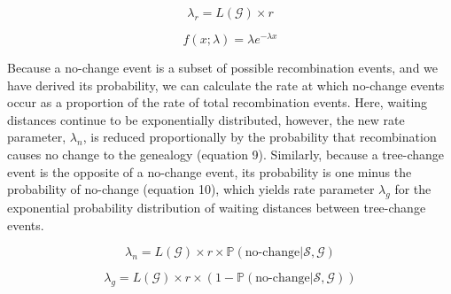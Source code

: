 \documentclass[11pt]{article}
\begin{document}

\begin{equation}
	\lambda_{r} = L(\mathcal{G}) \times r
\end{equation}


\begin{equation}
	f(x; \lambda) = \lambda e^{-\lambda x}
\end{equation}

\noindent Because a no-change event is a subset of possible recombination 
events, and we have derived its probability, we can calculate the rate 
at which no-change events occur as a proportion of the rate of total 
recombination events. 
Here, waiting distances continue to be exponentially distributed, 
however, the new rate parameter, $\lambda_n$, is reduced proportionally by 
the probability that recombination causes no change to the genealogy
(equation 9). Similarly, because a tree-change event is the opposite 
of a no-change event, its probability is one minus the probability
of no-change (equation 10), which yields rate parameter $\lambda_g$ for 
the exponential probability distribution of waiting distances between 
tree-change events.

\begin{equation}
	\lambda_{n} = 
	L(\mathcal{G}) \times r \times 
	\mathbb{P}(\text{no-change} | \mathcal{S},\mathcal{G})
\end{equation}


\begin{equation}
	\lambda_{g} = 
	L(\mathcal{G}) \times r \times 
	(1 - \mathbb{P}(\text{no-change} | \mathcal{S},\mathcal{G}))
\end{equation}

\end{document}
